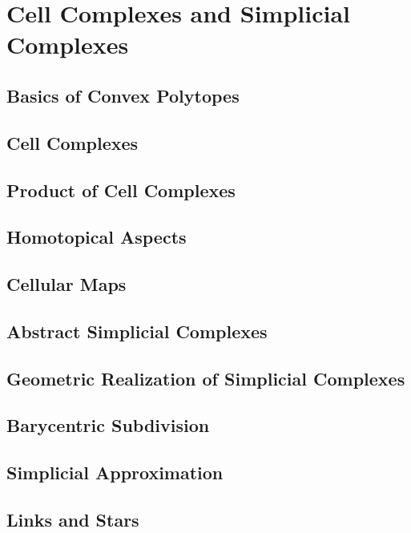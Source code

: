 \documentclass[11pt, a4paper]{article}
\begin{document}
\section{Cell Complexes and Simplicial Complexes}

\subsection{Basics of Convex Polytopes}

\subsection{Cell Complexes}

\subsection{Product of Cell Complexes}

\subsection{Homotopical Aspects}

\subsection{Cellular Maps}

\subsection{Abstract Simplicial Complexes}

\subsection{Geometric Realization of Simplicial Complexes}

\subsection{Barycentric Subdivision}

\subsection{Simplicial Approximation}

\subsection{Links and Stars}
\end{document}
